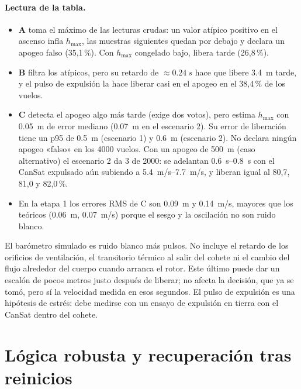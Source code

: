 \paragraph{Lectura de la tabla.}
\begin{itemize}
  \item \textbf{A} toma el máximo de las lecturas crudas: un valor atípico positivo en el
        ascenso infla $h_{\max}$, las muestras siguientes quedan por debajo y declara un
        apogeo falso (35,1\,\%). Con $h_{\max}$ congelado bajo, libera tarde (26,8\,\%).
  \item \textbf{B} filtra los atípicos, pero su retardo de $\approx\SI{0.24}{s}$ hace que
        libere \SI{3.4}{m} tarde, y el pulso de expulsión la hace liberar casi en el apogeo
        en el 38,4\,\% de los vuelos.
  \item \textbf{C} detecta el apogeo algo más tarde (exige dos votos), pero estima
        $h_{\max}$ con \SI{0.05}{m} de error mediano (\SI{0.07}{m} en el escenario 2). Su
        error de liberación tiene un p95 de \SI{0.5}{m} (escenario 1) y \SI{0.6}{m}
        (escenario 2). No declara ningún apogeo «falso» en los \num{4000} vuelos. Con un
        apogeo de \SI{500}{m} (caso alternativo) el escenario 2 da 3 de \num{2000}: se
        adelantan \SIrange{0.6}{0.8}{s} con el CanSat expulsado aún subiendo a
        \SIrange{5.4}{7.7}{m/s}, y liberan igual al 80,7, 81,0 y 82,0\,\%.
  \item En la etapa 1 los errores RMS de C son \SI{0.09}{m} y \SI{0.14}{m/s}, mayores que
        los teóricos (\SI{0.06}{m}, \SI{0.07}{m/s}) porque el sesgo y la oscilación no son
        ruido blanco.
\end{itemize}

\begin{nota}
El barómetro simulado es ruido blanco más pulsos. No incluye el retardo de los orificios de
ventilación, el transitorio térmico al salir del cohete ni el cambio del flujo alrededor del
cuerpo cuando arranca el rotor. Este último puede dar un escalón de pocos metros justo
después de liberar; no afecta la decisión, que ya se tomó, pero sí la velocidad medida en
esos segundos. El pulso de expulsión es una hipótesis de estrés: debe medirse con un ensayo
de expulsión en tierra con el CanSat dentro del cohete.
\end{nota}

\section{Lógica robusta y recuperación tras reinicios}\label{sec:electronica-logica}

